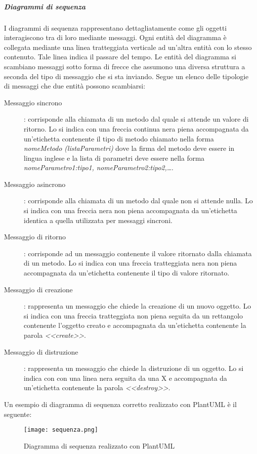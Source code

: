 \documentclass[../../norme-di-progetto.tex]{subfiles}
\begin{document}
\subparagraph{Diagrammi di sequenza}%
\label{subp:diagrammi_di_sequenza}
I diagrammi di sequenza rappresentano dettagliatamente come gli oggetti interagiscono tra di loro mediante messaggi.
Ogni entità del diagramma è collegata mediante una linea tratteggiata verticale ad un'altra entità con lo stesso contenuto.
Tale linea indica il passare del tempo.
Le entità del diagramma si scambiano messaggi sotto forma di frecce che assumono una diversa struttura a seconda del tipo di messaggio che si sta inviando.
Segue un elenco delle tipologie di messaggi che due entità possono scambiarsi:
\begin{description}
  \item [Messaggio sincrono]: corrisponde alla chiamata di un metodo dal quale si attende un valore di ritorno.
        Lo si indica con una freccia continua nera piena accompagnata da un'etichetta contenente il tipo di metodo chiamato nella forma \textit{nomeMetodo (listaParametri)} dove la firma del metodo deve essere in lingua inglese e la lista di parametri deve essere nella forma \textit{nomeParametro1:tipo1, nomeParametro2:tipo2,\ldots}.
  \item [Messaggio asincrono]: corrisponde alla chiamata di un metodo dal quale non si attende nulla.
        Lo si indica con una freccia nera non piena accompagnata da un'etichetta identica a quella utilizzata per messaggi sincroni.
  \item [Messaggio di ritorno]: corrisponde ad un messaggio contenente il valore ritornato dalla chiamata di un metodo.
        Lo si indica con una freccia tratteggiata nera non piena accompagnata da un'etichetta contenente il tipo di valore ritornato.
  \item [Messaggio di creazione]: rappresenta un messaggio che chiede la creazione di un nuovo oggetto.
        Lo si indica con una freccia tratteggiata non piena seguita da un rettangolo contenente l'oggetto creato e accompagnata da un'etichetta contenente la parola \textit{<<create>>}.
  \item [Messaggio di distruzione]: rappresenta un messaggio che chiede la distruzione di un oggetto.
        Lo si indica con con una linea nera  seguita da una X e accompagnata da un'etichetta contenente la parola \textit{<<destroy>>}.
\end{description}
Un esempio di diagramma di sequenza corretto realizzato con PlantUML è il seguente:
\begin{figure}[H]%
  \label{fig:sequenza}
  \texttt{[image: sequenza.png]}
  \centering
  \caption{Diagramma di sequenza realizzato con PlantUML}
\end{figure}
\end{document}
